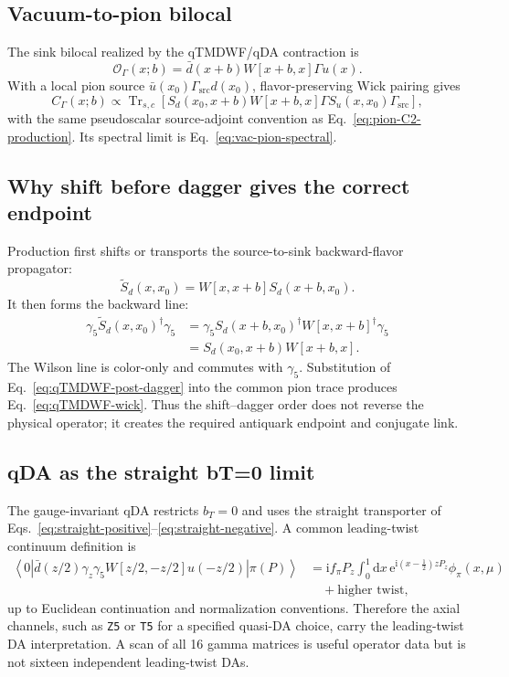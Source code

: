 \documentclass[11pt,a4paper]{article}
\numberwithin{equation}{section}
\newcommand{\ii}{\mathrm{i}}
\newcommand{\ee}{\mathrm{e}}
\newcommand{\dd}{\mathrm{d}}
\newcommand{\Trsc}{\operatorname{Tr}_{s,c}}
\newcommand{\avg}[1]{\left\langle #1\right\rangle}
\newcommand{\cO}{\mathcal{O}}
\newcommand{\Gsrc}{\Gamma_{\mathrm{src}}}
\newcommand{\code}[1]{%
  \ifmmode\text{\texttt{\detokenize{#1}}}\else\nolinkurl{#1}\fi}
\begin{document}
\subsection{Vacuum-to-pion bilocal}

The sink bilocal realized by the qTMDWF/qDA contraction is
\begin{equation}
 \cO_\Gamma(x;b)
 =\bar d(x+b)W[x+b,x]\Gamma u(x).
 \label{eq:qTMDWF-operator}
\end{equation}
With a local pion source
\(\bar u(x_0)\Gsrc d(x_0)\), flavor-preserving Wick pairing gives
\begin{equation}
 C_\Gamma(x;b)
 \propto
 \Trsc\left[
 S_d(x_0,x+b)W[x+b,x]\Gamma
 S_u(x,x_0)\Gsrc
 \right],
 \label{eq:qTMDWF-wick}
\end{equation}
with the same pseudoscalar source-adjoint convention as
Eq.~\eqref{eq:pion-C2-production}.  Its spectral limit is
Eq.~\eqref{eq:vac-pion-spectral}.

\subsection{Why shift before dagger gives the correct endpoint}

Production first shifts or transports the source-to-sink backward-flavor
propagator:
\begin{equation}
 \widetilde S_d(x,x_0)
 =W[x,x+b]S_d(x+b,x_0).
 \label{eq:qTMDWF-pre-dagger}
\end{equation}
It then forms the backward line:
\begin{align}
 \gamma_5\widetilde S_d(x,x_0)^\dagger\gamma_5
 &=
 \gamma_5S_d(x+b,x_0)^\dagger
 W[x,x+b]^\dagger\gamma_5
 \nonumber\\
 &=S_d(x_0,x+b)W[x+b,x].
 \label{eq:qTMDWF-post-dagger}
\end{align}
The Wilson line is color-only and commutes with \(\gamma_5\).  Substitution
of Eq.~\eqref{eq:qTMDWF-post-dagger} into the common pion trace produces
Eq.~\eqref{eq:qTMDWF-wick}.  Thus the shift--dagger order does not reverse the
physical operator; it creates the required antiquark endpoint and conjugate
link.

\subsection{qDA as the straight bT=0 limit}

The gauge-invariant qDA restricts \(b_T=0\) and uses the straight transporter
of Eqs.~\eqref{eq:straight-positive}--\eqref{eq:straight-negative}.  A common
leading-twist continuum definition is
\begin{align}
 \avg{0|\bar d(z/2)\gamma_z\gamma_5
 W[z/2,-z/2]u(-z/2)|\pi(P)}
 &=
 \ii f_\pi P_z
 \int_0^1\dd x\,
 \ee^{\ii(x-\frac12)zP_z}
 \phi_\pi(x,\mu)
 \nonumber\\
 &\quad+\text{higher twist},
 \label{eq:pion-DA}
\end{align}
up to Euclidean continuation and normalization conventions.  Therefore the
axial channels, such as \code{Z5} or \code{T5} for a specified quasi-DA
choice, carry the leading-twist DA interpretation.  A scan of all 16 gamma
matrices is useful operator data but is not sixteen independent
leading-twist DAs.
\end{document}
